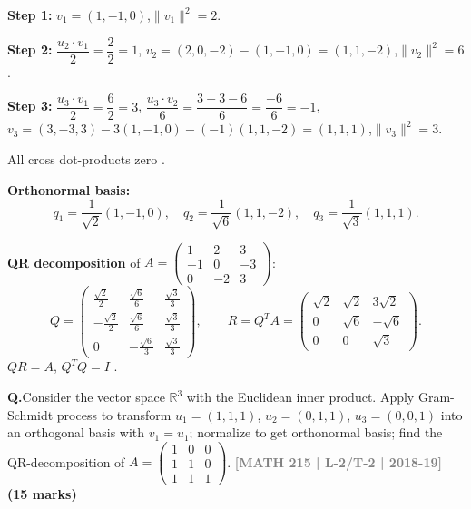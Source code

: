\documentclass[12pt,a3paper]{article}
\newcommand{\yr}[1]{\hfill\textcolor{gray}{\small\textbf{[#1]}}}
\newcommand{\mk}[1]{\textcolor{orange!70!black}{\small\textbf{(#1 marks)}}}
\newcounter{qnum}
\newcommand{\Q}[1]{%
  \needspace{4\baselineskip}
  \refstepcounter{qnum}
  \vspace{6pt}
  \noindent\textbf{Q\theqnum.}\enspace #1\par
}
\begin{document}
\begin{tcolorbox}[enhanced,breakable,
  colback=cD!4,colframe=cD,boxrule=0.8pt,arc=5pt,
  title={\textbf{Answer --- Gram-Schmidt \& QR: $u_1\!=\!(1,-1,0)$, $u_2\!=\!(2,0,-2)$, $u_3\!=\!(3,-3,3)$}},
  fonttitle=\bfseries\color{white},colbacktitle=cD]

\textbf{Step 1:} $v_1=(1,-1,0)$,\quad $\|v_1\|^2=2$.

\textbf{Step 2:} $\dfrac{u_2\cdot v_1}{2}=\dfrac{2}{2}=1$,\quad
$v_2=(2,0,-2)-(1,-1,0)=(1,1,-2)$,\quad $\|v_2\|^2=6$.

\textbf{Step 3:} $\dfrac{u_3\cdot v_1}{2}=\dfrac{6}{2}=3$,\;
$\dfrac{u_3\cdot v_2}{6}=\dfrac{3-3-6}{6}=\dfrac{-6}{6}=-1$,\quad
$v_3=(3,-3,3)-3(1,-1,0)-(-1)(1,1,-2)=(1,1,1)$,\quad $\|v_3\|^2=3$.

All cross dot-products zero . \checkmark

\textbf{Orthonormal basis:}
\[
q_1=\frac{1}{\sqrt{2}}(1,-1,0),\quad
q_2=\frac{1}{\sqrt{6}}(1,1,-2),\quad
q_3=\frac{1}{\sqrt{3}}(1,1,1).
\]

\textbf{QR decomposition} of $A=\begin{pmatrix}1&2&3\\-1&0&-3\\0&-2&3\end{pmatrix}$:
\[
Q=\begin{pmatrix}
\frac{\sqrt{2}}{2}&\frac{\sqrt{6}}{6}&\frac{\sqrt{3}}{3}\\[4pt]
-\frac{\sqrt{2}}{2}&\frac{\sqrt{6}}{6}&\frac{\sqrt{3}}{3}\\[4pt]
0&-\frac{\sqrt{6}}{3}&\frac{\sqrt{3}}{3}
\end{pmatrix},\qquad
R=Q^TA=\begin{pmatrix}\sqrt{2}&\sqrt{2}&3\sqrt{2}\\0&\sqrt{6}&-\sqrt{6}\\0&0&\sqrt{3}\end{pmatrix}.
\]
$QR=A$, $Q^TQ=I$ . \checkmark

\end{tcolorbox}


\Q{Consider the vector space $\mathbb{R}^3$ with the Euclidean inner product. Apply Gram-Schmidt process to transform $u_1 = (1,1,1)$, $u_2 = (0,1,1)$, $u_3 = (0,0,1)$ into an orthogonal basis with $v_1 = u_1$; normalize to get orthonormal basis; find the QR-decomposition of $A = \begin{pmatrix} 1 & 0 & 0 \\ 1 & 1 & 0 \\ 1 & 1 & 1 \end{pmatrix}$.
\yr{MATH 215 | L-2/T-2 | 2018-19} \mk{15}}
\end{document}
